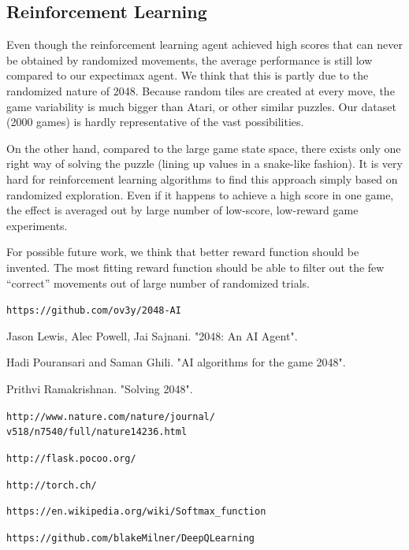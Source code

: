 \documentclass[9pt,twocolumn]{article}
\begin{document}
\subsection{Reinforcement Learning}

Even though the reinforcement learning agent achieved high scores that can never be obtained by randomized movements, the average performance is still low compared to our expectimax agent. We think that this is partly due to the randomized nature of 2048. Because random tiles are created at every move, the game variability is much bigger than Atari, or other similar puzzles. Our dataset (2000 games) is hardly representative of the vast possibilities.

On the other hand, compared to the large game state space, there exists only one right way of solving the puzzle (lining up values in a snake-like fashion). It is very hard for reinforcement learning algorithms to find this approach simply based on randomized exploration. Even if it happens to achieve a high score in one game, the effect is averaged out by large number of low-score, low-reward game experiments.

For possible future work, we think that better reward function should be invented. The most fitting reward function should be able to filter out the few “correct” movements out of large number of randomized trials.

\begin{thebibliography}{9}

 \texttt{https://github.com/ov3y/2048-AI}

 Jason Lewis, Alec Powell, Jai Sajnani. "2048: An AI Agent".

 Hadi Pouransari and Saman Ghili. "AI algorithms for the game 2048".

 Prithvi Ramakrishnan. "Solving 2048".

 \texttt{http://www.nature.com/nature/journal/\\v518/n7540/full/nature14236.html}

 \texttt{http://flask.pocoo.org/}

 \texttt{http://torch.ch/}

 \texttt{https://en.wikipedia.org/wiki/Softmax\_function}

 \texttt{https://github.com/blakeMilner/DeepQLearning}


\end{thebibliography}
\end{document}
